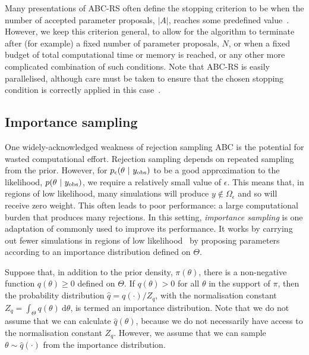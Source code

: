 \documentclass[review]{siamonline190516}
\begin{document}
Many presentations of ABC-RS often define the stopping criterion to be when the number of accepted parameter proposals, $|A|$, reaches some predefined value~\cite{Beaumont2010,Sisson2018}.
However, we keep this criterion general, to allow for the algorithm to terminate after (for example) a fixed number of parameter proposals, $N$, or when a fixed budget of total computational time or memory is reached, or any other more complicated combination of such conditions.
Note that ABC-RS is easily parallelised, although care must be taken to ensure that the chosen stopping condition is correctly applied in this case~\cite{Jagiella2017}.

\subsection{Importance sampling}
\label{s:ImportanceSampling}

One widely-acknowledged weakness of rejection sampling ABC is the potential for wasted computational effort. 
Rejection sampling depends on repeated sampling from the prior. 
However, for $p_\epsilon(\theta~|~y_{\mathrm{obs}})$ to be a good approximation to the likelihood, $p(\theta~|~y_{\mathrm{obs}})$, we require a relatively small value of $\epsilon$.
This means that, in regions of low likelihood, many simulations will produce $y \notin \Omega_\epsilon$ and so will receive zero weight.
This often leads to poor performance: a large computational burden that produces many rejections.
In this setting, \emph{importance sampling} is one adaptation of  commonly used to improve its performance.
It works by carrying out fewer simulations in regions of low likelihood~\cite{Sisson2018,Owen2013} by proposing parameters according to an importance distribution defined on $\Theta$.

Suppose that, in addition to the prior density, $\pi(\theta)$, there is a non-negative function $q(\theta) \geq 0$ defined on $\Theta$.
If $q(\theta)>0$ for all $\theta$ in the support of $\pi$, then the probability distribution $\hat q = q(\cdot)/Z_q$, with the normalisation constant $Z_q = \int_\Theta q(\theta) ~\mathrm d\theta$, is termed an importance distribution.
Note that we do not assume that we can calculate $\hat q(\theta)$, because we do not necessarily have access to the normalisation constant $Z_q$.
However, we assume that we can sample $\theta \sim \hat q(\cdot)$ from the importance distribution.
\end{document}
